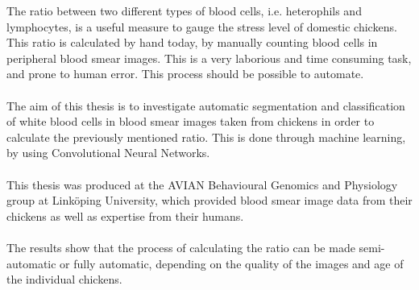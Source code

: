 The ratio between two different types of blood cells, i.e. heterophils and lymphocytes, is a useful measure to gauge the stress level of domestic chickens. This ratio is calculated by hand today, by manually counting blood cells in peripheral blood smear images. This is a very laborious and time consuming task, and prone to human error. This process should be possible to automate.\\\\
The aim of this thesis is to investigate automatic segmentation and classification of white blood cells in blood smear images taken from chickens in order to calculate the previously mentioned ratio. This is done through machine learning, by using Convolutional Neural Networks.\\\\
This thesis was produced at the AVIAN Behavioural Genomics and Physiology group at Linköping University, which provided blood smear image data from their chickens as well as expertise from their humans.\\\\
The results show that the process of calculating the ratio can be made semi-automatic or fully automatic, depending on the quality of the images and age of the individual chickens. 